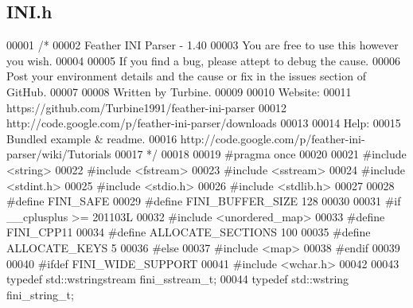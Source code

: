 \subsection{I\+N\+I.\+h}
\label{INI_8h_source}

\begin{DoxyCode}
00001 \textcolor{comment}{/*}
00002 \textcolor{comment}{   Feather INI Parser - 1.40}
00003 \textcolor{comment}{   You are free to use this however you wish.}
00004 \textcolor{comment}{}
00005 \textcolor{comment}{   If you find a bug, please attept to debug the cause.}
00006 \textcolor{comment}{   Post your environment details and the cause or fix in the issues section of GitHub.}
00007 \textcolor{comment}{}
00008 \textcolor{comment}{   Written by Turbine.}
00009 \textcolor{comment}{}
00010 \textcolor{comment}{   Website:}
00011 \textcolor{comment}{   https://github.com/Turbine1991/feather-ini-parser}
00012 \textcolor{comment}{   http://code.google.com/p/feather-ini-parser/downloads}
00013 \textcolor{comment}{}
00014 \textcolor{comment}{   Help:}
00015 \textcolor{comment}{   Bundled example & readme.}
00016 \textcolor{comment}{   http://code.google.com/p/feather-ini-parser/wiki/Tutorials}
00017 \textcolor{comment}{*/}
00018 
00019 \textcolor{preprocessor}{#pragma once}
00020 
00021 \textcolor{preprocessor}{#include <string>}
00022 \textcolor{preprocessor}{#include <fstream>}
00023 \textcolor{preprocessor}{#include <sstream>}
00024 \textcolor{preprocessor}{#include <stdint.h>}
00025 \textcolor{preprocessor}{#include <stdio.h>}
00026 \textcolor{preprocessor}{#include <stdlib.h>}
00027 
00028 \textcolor{preprocessor}{#define FINI\_SAFE}
00029 \textcolor{preprocessor}{#define FINI\_BUFFER\_SIZE 128}
00030 
00031 \textcolor{preprocessor}{#if \_\_cplusplus >= 201103L}
00032 \textcolor{preprocessor}{  #include <unordered\_map>}
00033 \textcolor{preprocessor}{  #define FINI\_CPP11}
00034 \textcolor{preprocessor}{  #define ALLOCATE\_SECTIONS 100}
00035 \textcolor{preprocessor}{  #define ALLOCATE\_KEYS 5}
00036 \textcolor{preprocessor}{#else}
00037 \textcolor{preprocessor}{  #include <map>}
00038 \textcolor{preprocessor}{#endif}
00039 
00040 \textcolor{preprocessor}{#ifdef FINI\_WIDE\_SUPPORT}
00041 \textcolor{preprocessor}{  #include <wchar.h>}
00042 
00043   \textcolor{keyword}{typedef} std::wstringstream fini_sstream_t;
00044   \textcolor{keyword}{typedef} std::wstring fini_string_t;

\end{DoxyCode}
